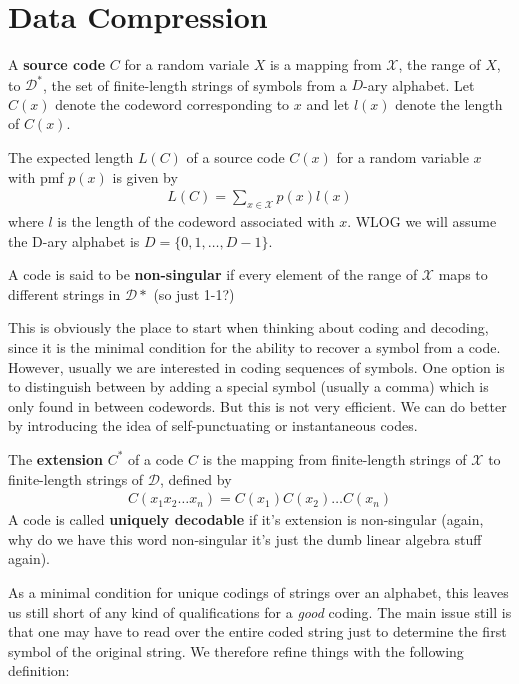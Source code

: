\section{Data Compression}
\begin{definition}
	A \textbf{source code} $C$ for a random variale $X$ is a mapping from $\mathcal{X}$, the range of $X$, to $\mathcal{D}^*$, the set of finite-length strings of symbols from a $D$-ary alphabet. Let $C(x)$ denote the codeword corresponding to $x$ and let $l(x)$ denote the length of $C(x)$. 
\end{definition}
\begin{definition}
	The expected length $L(C)$ of a source code $C(x)$ for a random variable $x$ with pmf $p(x)$ is given by 
	\begin{align}
		L(C) = \sum_{x \in \mathcal{X}} p(x)l(x)
	\end{align}
where $l$ is the length of the codeword associated with $x$. WLOG we will assume the D-ary alphabet is $D = \{0,1,\ldots,D-1\}$. 
\end{definition}
\begin{definition}
	A code is said to be \textbf{non-singular} if every element of the range of $\mathcal{X}$ maps to different strings in $\mathcal{D}*$ (so just 1-1?)
\end{definition}
This is obviously the place to start when thinking about coding and decoding, since it is the minimal condition for the ability to recover a symbol from a code. However, usually we are interested in coding sequences of symbols. One option is to distinguish between by adding a special symbol (usually a comma) which is only found in between codewords. But this is not very efficient. We can do better by introducing the idea of self-punctuating or instantaneous codes. 
\begin{definition}
	The \textbf{extension} $C^*$ of a code $C$ is the mapping from finite-length strings of $\mathcal{X}$ to finite-length strings of $\mathcal{D}$, defined by 
	\begin{align}
		C(x_1x_2\ldots x_n) = C(x_1)C(x_2)\ldots C(x_n)
	\end{align}
A code is called \textbf{uniquely decodable} if it's extension is non-singular (again, why do we have this word non-singular it's just the dumb linear algebra stuff again). 
\end{definition}
As a minimal condition for unique codings of strings over an alphabet, this leaves us still short of any kind of qualifications for a \emph{good} coding. The main issue still is that one may have to read over the entire coded string just to determine the first symbol of the original string. We therefore refine things with the following definition:
